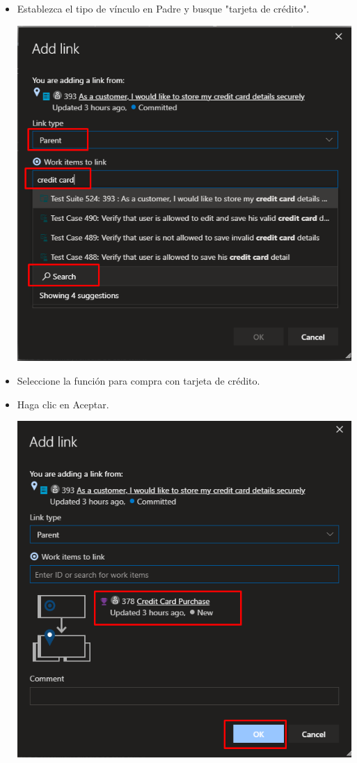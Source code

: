 \begin{itemize}
\item Establezca el tipo de vínculo en Padre y busque "tarjeta de crédito".
\begin{center}
\includegraphics[width=\columnwidth]{images/25}\newline
\end{center}

\item Seleccione la función para compra con tarjeta de crédito.
\item Haga clic en Aceptar.
\begin{center}
\includegraphics[width=\columnwidth]{images/26}\newline
\end{center}


\end{itemize}
